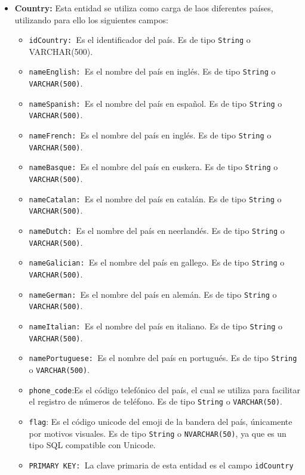 \begin{itemize}

    \item \textbf{Country: }Esta entidad se utiliza como carga de laos diferentes países, utilizando para ello los siguientes campos:
    \begin{itemize}
      \item \texttt{idCountry: }Es el identificador del país. Es de tipo \texttt{String} o VARCHAR(500).
      \item \texttt{nameEnglish: }Es el nombre del país en inglés. Es de tipo \texttt{String} o \texttt{VARCHAR(500)}.
      \item \texttt{nameSpanish: }Es el nombre del país en español. Es de tipo \texttt{String} o \texttt{VARCHAR(500)}. 
      \item \texttt{nameFrench: }Es el nombre del país en inglés. Es de tipo \texttt{String} o \texttt{VARCHAR(500)}.
      \item \texttt{nameBasque: }Es el nombre del país en euskera. Es de tipo \texttt{String} o \texttt{VARCHAR(500)}.
      \item \texttt{nameCatalan: }Es el nombre del país en catalán. Es de tipo \texttt{String} o \texttt{VARCHAR(500)}. 
      \item \texttt{nameDutch: }Es el nombre del país en neerlandés. Es de tipo \texttt{String} o \texttt{VARCHAR(500)}.
      \item \texttt{nameGalician: }Es el nombre del país en gallego. Es de tipo \texttt{String} o \texttt{VARCHAR(500)}.
      \item \texttt{nameGerman: }Es el nombre del país en alemán. Es de tipo \texttt{String} o \texttt{VARCHAR(500)}. 
      \item \texttt{nameItalian: }Es el nombre del país en italiano. Es de tipo \texttt{String} o \texttt{VARCHAR(500)}.
      \item \texttt{namePortuguese: }Es el nombre del país en portugués. Es de tipo \texttt{String} o \texttt{VARCHAR(500)}.
      \item \texttt{phone\_code}:Es el código telefónico del país, el cual se utiliza para facilitar el registro de números de teléfono. Es de tipo \texttt{String} o \texttt{VARCHAR(50)}.
      \item \texttt{flag}: Es el código unicode del emoji de la bandera del país, únicamente por motivos visuales. Es de tipo \texttt{String} o \texttt{NVARCHAR(50)}, ya que es un tipo SQL compatible con Unicode.
      \item \texttt{PRIMARY KEY: }La clave primaria de esta entidad es el campo \texttt{idCountry}
    \end{itemize}


\end{itemize}
